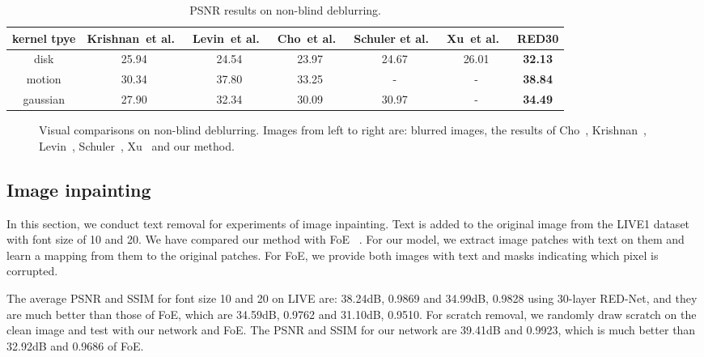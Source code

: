 \begin{table*}[htb]
\centering
%
\caption{PSNR results on non-blind deblurring.}
\begin{tabular}{c|c c c c c c} \hline
  kernel tpye  &Krishnan~et al.~\cite{DBLP:conf/nips/KrishnanF09}
  &Levin~et al.~\cite{DBLP:journals/tog/LevinFDF07}
               &Cho~et al.~\cite{DBLP:conf/iccv/ChoWL11}
               &Schuler et al.~\cite{DBLP:conf/cvpr/SchulerBHS13}
               &Xu~et al.~\cite{DBLP:conf/nips/XuRLJ14}    &RED30	\\ \hline
  disk    	&25.94  &24.54  &23.97  &24.67  &26.01  &\textbf{32.13}	\\ \hline
  motion    &30.34  &37.80  &33.25  &-      &-      &\textbf{38.84}	\\ \hline
  gaussian  &27.90  &32.34  &30.09  &30.97  &-      &\textbf{34.49}	\\ \hline
 \end{tabular}
\label{table10}
\end{table*}




\begin{figure*}
\centering
{}
\caption{Visual comparisons on non-blind deblurring. Images from left to right are:
blurred images, the results of Cho~\cite{DBLP:conf/iccv/ChoWL11},
Krishnan~\cite{DBLP:conf/nips/KrishnanF09}, Levin~\cite{DBLP:journals/tog/LevinFDF07},
Schuler~\cite{DBLP:conf/cvpr/SchulerBHS13}, Xu~\cite{DBLP:conf/nips/XuRLJ14}
and our method.}
\label{fig17}
\end{figure*}




\subsection{Image inpainting}
In this section,
we conduct text removal for experiments of image inpainting. Text is added
to the original image from the LIVE1 dataset  with font size of 10 and 20.
We have compared our method with FoE ~\cite{DBLP:journals/ijcv/RothB09}. For our model,
we extract image patches with text on them and learn a mapping from them to the
original patches. For FoE, we provide both images with text and masks indicating
which pixel is corrupted.

The average PSNR and SSIM for font size 10 and 20 on LIVE are:
38.24dB, 0.9869 and 34.99dB, 0.9828 using 30-layer RED-Net, and they are much
better than those of FoE, which are 34.59dB, 0.9762 and 31.10dB, 0.9510. For scratch
removal, we randomly draw scratch on the clean image and test with our network and FoE. The PSNR and SSIM for our network are 39.41dB and 0.9923, which is much better than 32.92dB and 0.9686 of FoE.

